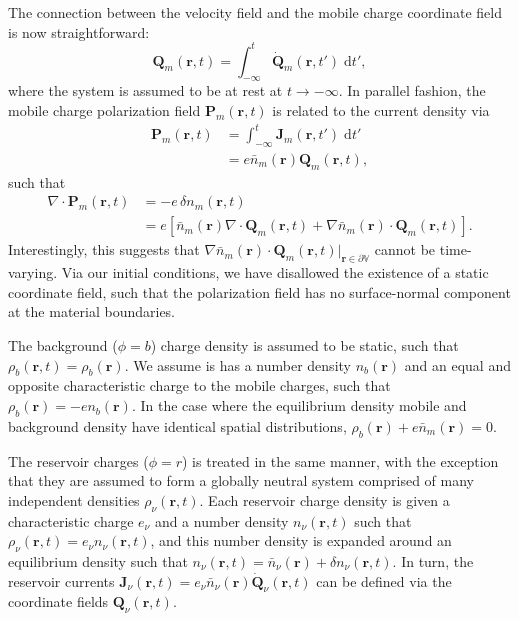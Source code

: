 \documentclass{article}
\begin{document}
The connection between the velocity field and the mobile charge coordinate field is now straightforward:
\begin{equation}
\mathbf{Q}_m(\mathbf{r},t) = \int_{-\infty}^t\dot{\mathbf{Q}}_m(\mathbf{r},t')\;\mathrm{d}t',
\end{equation}
where the system is assumed to be at rest at $t\to-\infty$. In parallel fashion, the mobile charge polarization field $\mathbf{P}_m(\mathbf{r},t)$ is related to the current density via
\begin{equation}
\begin{split}
\mathbf{P}_m(\mathbf{r},t) &= \int_{-\infty}^t\mathbf{J}_m(\mathbf{r},t')\;\mathrm{d}t'\\
&= e\bar{n}_m(\mathbf{r})\mathbf{Q}_m(\mathbf{r},t),
\end{split}
\end{equation}
such that
\begin{equation}
\begin{split}
\nabla\cdot\mathbf{P}_{m}(\mathbf{r},t) &= -e\,\delta n_{m}(\mathbf{r},t)\\
&= e\left[\bar{n}_{m}(\mathbf{r})\nabla\cdot\mathbf{Q}_{m}(\mathbf{r},t) + \nabla\bar{n}_{m}(\mathbf{r})\cdot\mathbf{Q}_{m}(\mathbf{r},t)\right].
\end{split}
\end{equation}
Interestingly, this suggests that $\nabla\bar{n}_{m}(\mathbf{r})\cdot\mathbf{Q}_{m}(\mathbf{r},t)|_{\mathbf{r}\in\partial\mathbb{V}}$ cannot be time-varying. Via our initial conditions, we have disallowed the existence of a static coordinate field, such that the polarization field has no surface-normal component at the material boundaries.

The background ($\phi = b$) charge density is assumed to be static, such that $\rho_b(\mathbf{r},t) = \rho_b(\mathbf{r})$. We assume is has a number density $n_b(\mathbf{r})$ and an equal and opposite characteristic charge to the mobile charges, such that $\rho_b(\mathbf{r}) = -en_b(\mathbf{r})$. In the case where the equilibrium density mobile and background density have identical spatial distributions, $\rho_b(\mathbf{r}) + e\bar{n}_m(\mathbf{r}) = 0$.

The reservoir charges ($\phi = r$) is treated in the same manner, with the exception that they are assumed to form a globally neutral system comprised of many independent densities $\rho_\nu(\mathbf{r},t)$. Each reservoir charge density is given a characteristic charge $e_\nu$ and a  number density $n_\nu(\mathbf{r},t)$ such that $\rho_\nu(\mathbf{r},t) = e_\nu n_\nu(\mathbf{r},t)$, and this number density is expanded around an equilibrium density such that $n_\nu(\mathbf{r},t) = \bar{n}_\nu(\mathbf{r}) + \delta n_\nu(\mathbf{r},t)$. In turn, the reservoir currents $\mathbf{J}_\nu(\mathbf{r},t) = e_\nu\bar{n}_\nu(\mathbf{r})\dot{\mathbf{Q}}_\nu(\mathbf{r},t)$ can be defined via the coordinate fields $\mathbf{Q}_\nu(\mathbf{r},t)$.
\end{document}
